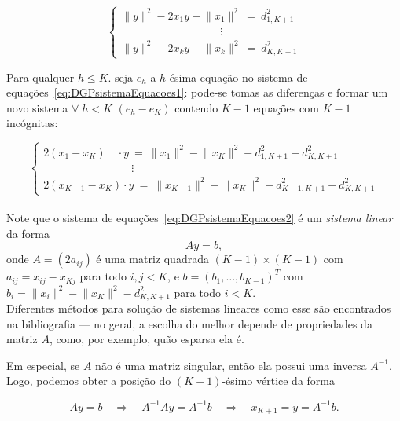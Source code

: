 \begin{equation}
	\begin{cases} 
		\lVert y \rVert^2 -2x_1y + \lVert x_1\rVert^2 \ = \ d^2_{1,K+1}
		\\
		\qquad\qquad\qquad\quad\qquad \!\vdots
		\\
		\lVert y \rVert^2 -2x_ky + \lVert x_k\rVert^2 \ = \ d^2_{K,K+1}
	\end{cases}
	\label{eq:DGPsistemaEquacoes1}
\end{equation}

Para qualquer $h\leq K$. seja $e_h$ a $h$-ésima equação no sistema de equações~\ref{eq:DGPsistemaEquacoes1}: pode-se tomas as diferenças e formar um novo sistema $\forall\; h<K$ $(e_h-e_K)$ contendo $K-1$ equações com $K-1$ incógnitas:

\begin{equation}
\begin{cases} 
2(x_1-x_K) \quad\cdot y \ = \ \lVert x_1\rVert^2 - \lVert x_K\rVert^2 - d^2_{1,K+1} + d^2_{K,K+1} 
\\
\qquad\qquad\qquad\qquad\!\!\!\vdots
\\
2(x_{K-1}-x_K) \cdot y \ = \ \lVert x_{K-1}\rVert^2 - \lVert x_K\rVert^2 - d^2_{K-1,K+1} + d^2_{K,K+1} 
\end{cases}
\label{eq:DGPsistemaEquacoes2}
\end{equation}
\\

Note que o sistema de equações~\ref{eq:DGPsistemaEquacoes2} é um \textit{sistema linear} da forma 
\begin{equation}
	Ay=b,
	\label{eq:DGPLinearSystem}
\end{equation}
onde $A = (2a_{ij})$ é uma matriz quadrada $(K-1) \times (K-1)$ com $a_{ij} = x_{ij} - x_{Kj}$ para todo $i,j < K$, e $b = (b_1, \dots, b_{K-1})^T$ com $b_i = \lVert x_i\rVert^2 - \lVert x_K\rVert^2 - d^2_{K,K+1}$ para todo $i<K$. 
\\

Diferentes métodos para solução de sistemas lineares como esse são encontrados na bibliografia \cite{AlgebraLinearElon, libertiEDG} --- no geral, a escolha do melhor depende de propriedades da matriz $A$, como, por exemplo, quão esparsa ela é. 

Em especial, se $A$ não é uma matriz singular, então ela possui uma inversa $A^{-1}$. Logo, podemos obter a posição do $(K+1)$-ésimo vértice da forma

\begin{equation}
	Ay = b \quad \Rightarrow \quad A^{-1}Ay = A^{-1}b \quad \Rightarrow \quad x_{K+1} = y = A^{-1}b.
\end{equation}

